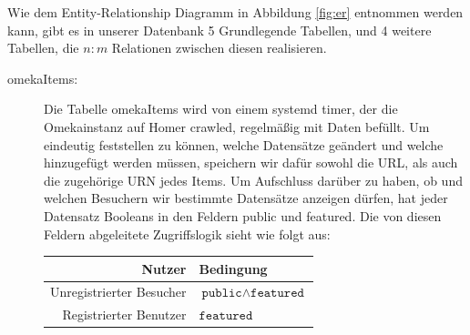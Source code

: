 \documentclass{article}
\begin{document}
Wie dem Entity-Relationship Diagramm in Abbildung \ref{fig:er} entnommen werden kann,
gibt es in unserer Datenbank 5 Grundlegende Tabellen,
und 4 weitere Tabellen,
die $n:m$ Relationen zwischen diesen realisieren.

\begin{description}
\item[omekaItems:]
    Die Tabelle omekaItems wird von einem systemd timer,
    der die Omekainstanz auf Homer crawled,
    regelmäßig mit Daten befüllt.
    Um eindeutig feststellen zu können,
    welche Datensätze geändert und welche hinzugefügt werden müssen,
    speichern wir dafür sowohl die URL,
    als auch die zugehörige URN jedes Items.
    Um Aufschluss darüber zu haben,
    ob und welchen Besuchern wir bestimmte Datensätze anzeigen dürfen,
    hat jeder Datensatz Booleans in den Feldern public und featured.
    Die von diesen Feldern abgeleitete Zugriffslogik sieht wie folgt aus:

    \begin{tabular}{r|l}
    Nutzer & Bedingung\\\hline
    Unregistrierter Besucher & $\texttt{public}\land\texttt{featured}$\\
    Registrierter Benutzer & $\texttt{featured}$%
    \end{tabular}


\end{description}
\end{document}
